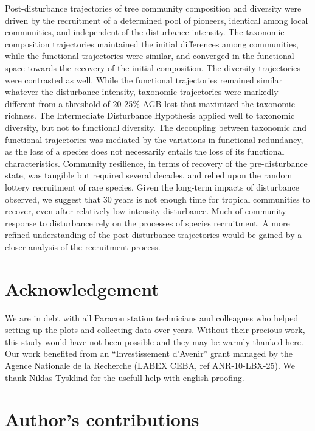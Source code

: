 \documentclass[fleqn,10pt]{ArtEcoFoG} %
\theoremstyle{definition}
\theoremstyle{definition}
\theoremstyle{definition}
\theoremstyle{remark}
\begin{document}
Post-disturbance trajectories of tree community composition and
diversity were driven by the recruitment of a determined pool of
pioneers, identical among local communities, and independent of the
disturbance intensity. The taxonomic composition trajectories maintained
the initial differences among communities, while the functional
trajectories were similar, and converged in the functional space towards
the recovery of the initial composition. The diversity trajectories were
contrasted as well. While the functional trajectories remained similar
whatever the disturbance intensity, taxonomic trajectories were markedly
different from a threshold of 20-25\% AGB lost that maximized the
taxonomic richness. The Intermediate Disturbance Hypothesis applied well
to taxonomic diversity, but not to functional diversity. The decoupling
between taxonomic and functional trajectories was mediated by the
variations in functional redundancy, as the loss of a species does not
necessarily entails the loss of its functional characteristics.
Community resilience, in terms of recovery of the pre-disturbance state,
was tangible but required several decades, and relied upon the random
lottery recruitment of rare species. Given the long-term impacts of
disturbance observed, we suggest that 30 years is not enough time for
tropical communities to recover, even after relatively low intensity
disturbance. Much of community response to disturbance rely on the
processes of species recruitment. A more refined understanding of the
post-disturbance trajectories would be gained by a closer analysis of
the recruitment process.

\section{Acknowledgement}\label{acknowledgement}

We are in debt with all Paracou station technicians and colleagues who
helped setting up the plots and collecting data over years. Without
their precious work, this study would have not been possible and they
may be warmly thanked here. Our work benefited from an ``Investissement
d'Avenir'' grant managed by the Agence Nationale de la Recherche (LABEX
CEBA, ref ANR-10-LBX-25). We thank Niklas Tysklind for the usefull help
with english proofing.

\section{Author's contributions}\label{authors-contributions}
\end{document}
